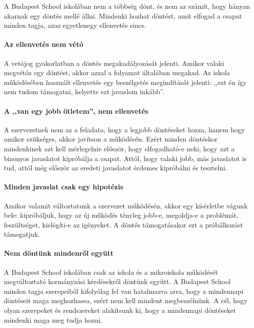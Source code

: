 A Budapest School iskolában nem a többség dönt, és nem az számít, hogy hányan akarnak egy döntés mellé állni. Mindenki hozhat döntést, amit elfogad a csapat minden tagja, azaz egyetlenegy ellenvetés sincs.

\paragraph{Az ellenvetés nem vétó}

A vetójog gyakorlatban a döntés megakadályozását jelenti. Amikor valaki megvétóz egy döntést, akkor azzal a folyamat általában megakad. Az iskola működésében használt ellenvetés egy beszélgetés megindítását jelenti: ,,ezt én így nem tudom támogatni, helyette ezt javaslom inkább''.

\paragraph{A ,,van egy jobb ötletem'', nem ellenvetés}

A szervezetnek nem az a feladata, hogy a legjobb döntéseket hozza, hanem hogy amikor szükséges, akkor javítson a működésén. Ezért minden döntéskor mindenkinek azt kell mérlegelnie először, hogy elfogadható-e neki, hogy azt a bizonyos javaslatot kipróbálja a csapat. Attól, hogy valaki jobb, más javaslatot is tud, attól még először az eredeti javaslatot érdemes kipróbálni és tesztelni.

\paragraph{Minden javaslat csak egy hipotézis}

Amikor valamit változtatunk a szervezet működésén, akkor egy kísérletbe vágunk bele: kipróbáljuk, hogy az új működés tényleg jobb-e, megoldja-e a problémát, feszültséget, kielégí\-ti-e az igényeket. A döntés támogatásakor ezt a próbálkozást támogatjuk.

\paragraph{Nem döntünk mindenről együtt}

A Budapest School iskolában csak az iskola és a mikroiskola működését megváltoztató kormányzási kérdésekről döntünk együtt. A Budapest School minden tagja szerepeiből kifolyólag fel van hatalmazva arra, hogy a mindennapi döntéseit maga meghozhassa, ezért nem kell mindent megbeszélnünk. A cél, hogy olyan szerepeket és rendszereket alakítsunk ki, hogy a mindennapi döntéseket mindenki maga meg tudja hozni.

